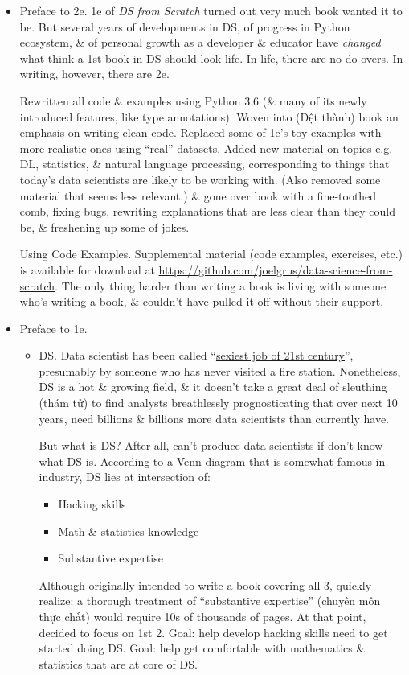 \documentclass{article}
\begin{document}
\begin{itemize}
	\item {\sf Preface to 2e.} 1e of {\it DS from Scratch} turned out very much book wanted it to be. But several years of developments in DS, of progress in Python ecosystem, \& of personal growth as a developer \& educator have {\it changed} what think a 1st book in DS should look life. In life, there are no do-overs. In writing, however, there are 2e.
	
	Rewritten all code \& examples using Python 3.6 (\& many of its newly introduced features, like type annotations). Woven into (Dệt thành) book an emphasis on writing clean code. Replaced some of 1e's toy examples with more realistic ones using ``real'' datasets. Added new material on topics e.g. DL, statistics, \& natural language processing, corresponding to things that today's data scientists are likely to be working with. (Also removed some material that seems less relevant.) \& gone over book with a fine-toothed comb, fixing bugs, rewriting explanations that are less clear than they could be, \& freshening up some of jokes.
	
	{\sf Using Code Examples.} Supplemental material (code examples, exercises, etc.) is available for download at \url{https://github.com/joelgrus/data-science-from-scratch}. The only thing harder than writing a book is living with someone who's writing a book, \& couldn't have pulled it off without their support.
	\item {\sf Preface to 1e.}
	\begin{itemize}
		\item {\sf DS.} Data scientist has been called ``\href{https://hbr.org/2012/10/data-scientist-the-sexiest-job-of-the-21st-century}{sexiest job of 21st century}'', presumably by someone who has never visited a fire station. Nonetheless, DS is a hot \& growing field, \& it doesn't take a great deal of sleuthing (thám tử) to find analysts breathlessly prognosticating that over next 10 years, need billions \& billions more data scientists than currently have.
		
		But what is DS? After all, can't produce data scientists if don't know what DS is. According to a \href{http://drewconway.com/zia/2013/3/26/the-data-science-venn-diagram}{Venn diagram} that is somewhat famous in industry, DS lies at intersection of:
		\begin{itemize}
			\item Hacking skills
			\item Math \& statistics knowledge
			\item Substantive expertise
		\end{itemize}
		Although originally intended to write a book covering all 3, quickly realize: a thorough treatment of ``substantive expertise'' (chuyên môn thực chất) would require 10s of thousands of pages. At that point, decided to focus on 1st 2. Goal: help develop hacking skills need to get started doing DS. Goal: help get comfortable with mathematics \& statistics that are at core of DS.
		

\end{itemize}
\end{itemize}
\end{document}
